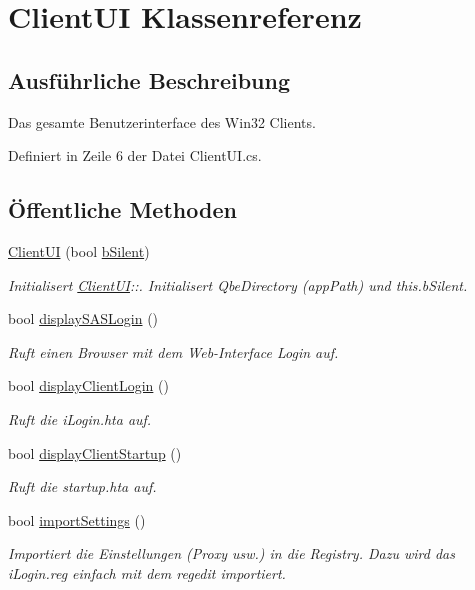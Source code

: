 \hypertarget{classQbeSAS_1_1ClientUI}{
\section{Client\-UI Klassenreferenz}
\label{classQbeSAS_1_1ClientUI}
}


\subsection{Ausf\"{u}hrliche Beschreibung}
Das gesamte Benutzerinterface des Win32 Clients. 



Definiert in Zeile 6 der Datei Client\-UI.cs.\subsection*{\"{O}ffentliche Methoden}
\begin{CompactItemize}
\item 
\hyperlink{classQbeSAS_1_1ClientUI_QbeSAS_1_1ClientUIa0}{Client\-UI} (bool \hyperlink{classQbeSAS_1_1ClientUI_QbeSAS_1_1ClientUIr0}{b\-Silent})
\begin{CompactList}\small\item\em Initialisert \hyperlink{classQbeSAS_1_1ClientUI}{Client\-UI}::. Initialisert Qbe\-Directory (app\-Path) und this.b\-Silent. \item\end{CompactList}\item 
bool \hyperlink{classQbeSAS_1_1ClientUI_QbeSAS_1_1ClientUIa1}{display\-SASLogin} ()
\begin{CompactList}\small\item\em Ruft einen Browser mit dem Web-Interface Login auf. \item\end{CompactList}\item 
bool \hyperlink{classQbeSAS_1_1ClientUI_QbeSAS_1_1ClientUIa2}{display\-Client\-Login} ()
\begin{CompactList}\small\item\em Ruft die i\-Login.hta auf. \item\end{CompactList}\item 
bool \hyperlink{classQbeSAS_1_1ClientUI_QbeSAS_1_1ClientUIa3}{display\-Client\-Startup} ()
\begin{CompactList}\small\item\em Ruft die startup.hta auf. \item\end{CompactList}\item 
bool \hyperlink{classQbeSAS_1_1ClientUI_QbeSAS_1_1ClientUIa4}{import\-Settings} ()
\begin{CompactList}\small\item\em Importiert die Einstellungen (Proxy usw.) in die Registry. Dazu wird das i\-Login.reg einfach mit dem regedit importiert. \item\end{CompactList}\end{CompactItemize}
